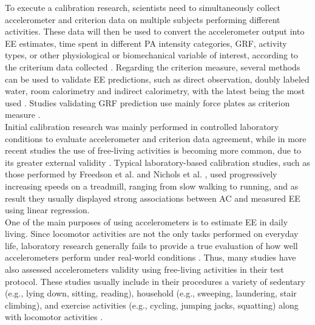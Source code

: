 \documentclass[11pt]{article}
\begin{document}
To execute a calibration research, scientists need to simultaneously collect accelerometer and criterion data on multiple subjects performing different activities. These data will then be used to convert the accelerometer output into EE estimates, time spent in different PA intensity categories, GRF, activity types, or other physiological or biomechanical variable of interest, according to the criterium data collected \cite{Basset_2012}. Regarding the criterion measure, several methods can be used to validate EE predictions, such as direct observation, doubly labeled water, room calorimetry and indirect calorimetry, with the latest being the most used \cite{Basset_2012, Mendes_2018}. Studies validating GRF prediction use mainly force plates as criterion measure \cite{Neugebauer_2018, Neugebauer_2014, Fortune_2014}. \\

Initial calibration research was mainly performed in controlled laboratory conditions to evaluate accelerometer and criterion data agreement, while in more recent studies the use of free-living activities is becoming more common, due to its greater external validity \cite{Welk_2005, Matthews_2005}. Typical laboratory-based calibration studies, such as those performed by Freedson et al. \citeyear{Freedson_1998} and Nichols et al. \citeyear{Nichols_1999}, used progressively increasing speeds on a treadmill, ranging from slow walking to running, and as result they usually displayed strong associations between AC and measured EE using linear regression. \\

One of the main purposes of using accelerometers is to estimate EE in daily living. Since locomotor activities are not the only tasks performed on everyday life, laboratory research generally fails to provide a true evaluation of how well accelerometers perform under real-world conditions \cite{Welk_2005}. Thus, many studies have also assessed accelerometers validity using free-living activities in their test protocol. These studies usually include in their procedures a variety of sedentary (e.g., lying down, sitting, reading), household (e.g., sweeping, laundering, stair climbing), and exercise activities (e.g., cycling, jumping jacks, squatting) along with locomotor activities \cite{Montoye_2015, Montoye_2016b}. \\
\end{document}
